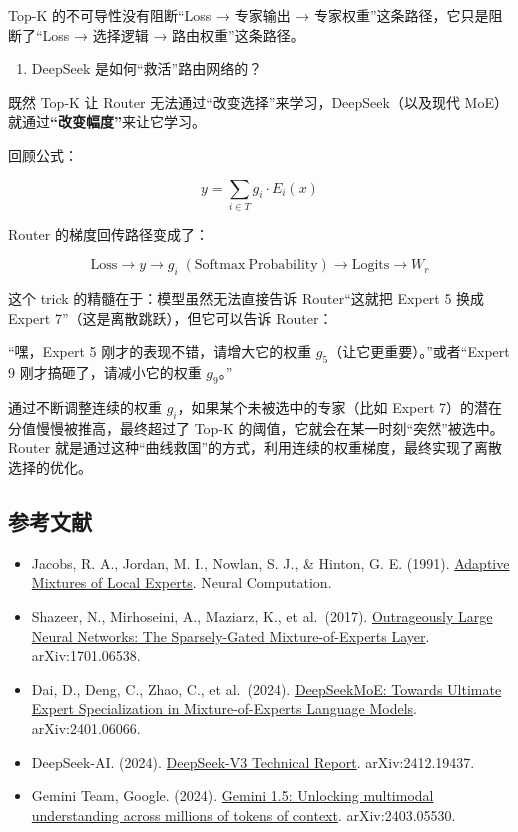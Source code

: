 Top-K 的不可导性没有阻断``Loss → 专家输出 → 专家权重''这条路径，它只是阻断了``Loss → 选择逻辑 → 路由权重''这条路径。

\begin{enumerate}
\def\labelenumi{\arabic{enumi}.}
\setcounter{enumi}{2}
\tightlist
\item
  DeepSeek 是如何``救活''路由网络的？
\end{enumerate}

既然 Top-K 让 Router 无法通过``改变选择''来学习，DeepSeek（以及现代 MoE）就通过\textbf{``改变幅度''}来让它学习。

回顾公式：

\[
y=\sum_{i\in T}g_i\cdot E_i(x)
\]

Router 的梯度回传路径变成了：

\[
\mathrm{Loss}\rightarrow y\rightarrow g_i\;(\mathrm{Softmax\ Probability})\rightarrow \mathrm{Logits}\rightarrow W_r
\]

这个 trick 的精髓在于：模型虽然无法直接告诉 Router``这就把 Expert 5 换成 Expert 7''（这是离散跳跃），但它可以告诉 Router：

``嘿，Expert 5 刚才的表现不错，请增大它的权重 \(g_5\)（让它更重要）。''或者``Expert 9 刚才搞砸了，请减小它的权重 \(g_9\)。''

通过不断调整连续的权重 \(g_i\)，如果某个未被选中的专家（比如 Expert 7）的潜在分值慢慢被推高，最终超过了 Top-K 的阈值，它就会在某一时刻``突然''被选中。Router 就是通过这种``曲线救国''的方式，利用连续的权重梯度，最终实现了离散选择的优化。

\FloatBarrier
{}
\hypertarget{ux53c2ux8003ux6587ux732e-77}{%
\subsection{参考文献}\label{ux53c2ux8003ux6587ux732e-77}}

\vspace{0.25em}
\begin{itemize}
\tightlist
\item
  Jacobs, R. A., Jordan, M. I., Nowlan, S. J., \& Hinton, G. E. (1991). \href{https://doi.org/10.1162/neco.1991.3.1.79}{Adaptive Mixtures of Local Experts}. Neural Computation.
\item
  Shazeer, N., Mirhoseini, A., Maziarz, K., et al.~(2017). \href{https://arxiv.org/abs/1701.06538}{Outrageously Large Neural Networks: The Sparsely-Gated Mixture-of-Experts Layer}. arXiv:1701.06538.
\item
  Dai, D., Deng, C., Zhao, C., et al.~(2024). \href{https://arxiv.org/abs/2401.06066}{DeepSeekMoE: Towards Ultimate Expert Specialization in Mixture-of-Experts Language Models}. arXiv:2401.06066.
\item
  DeepSeek-AI. (2024). \href{https://arxiv.org/abs/2412.19437}{DeepSeek-V3 Technical Report}. arXiv:2412.19437.
\item
  Gemini Team, Google. (2024). \href{https://arxiv.org/abs/2403.05530}{Gemini 1.5: Unlocking multimodal understanding across millions of tokens of context}. arXiv:2403.05530.
\end{itemize}

\clearpage
